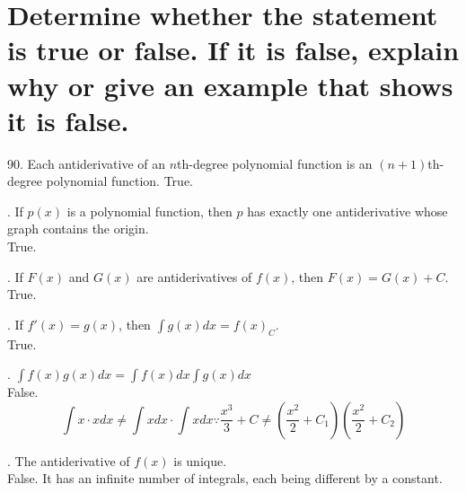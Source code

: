 \documentclass[11pt]{article}
\newcommand*{\vs}{\vspace{1cm}}
\newcommand*{\next}{\noindent}
\begin{document}
\section{Determine whether the
statement is true or false. If it is false, explain why or give an
example that shows it is false.}

90. Each antiderivative of an $n$th-degree polynomial function is an
$(n+1)$th-degree polynomial function.
\indent True.

\vs\next
91. If $p(x)$ is a polynomial function, then $p$ has exactly one
antiderivative whose graph contains the origin.\\
\indent True.

\vs\next
92. If $F(x)$ and $G(x)$ are antiderivatives of $f(x)$, then $F(x)=G(x)+C$.\\
\indent True.

\vs\next
93. If $f'(x)=g(x)$, then $\int g(x)dx=f(x)_C$.\\
\indent True.

\vs\next
94. $\int f(x)g(x)dx=\int f(x)dx\int g(x)dx$\\
\indent False.
\[\int x\cdot xdx\neq\int xdx\cdot\int xdx\because \frac{x^3}{3}+C\neq\left(\frac{x^2}{2}+C_1\right)\left(\frac{x^2}{2}+C_2\right)\]

\vs\next
95. The antiderivative of $f(x)$ is unique.\\
\indent False. It has an infinite number of integrals, each being different by a constant.
\end{document}
